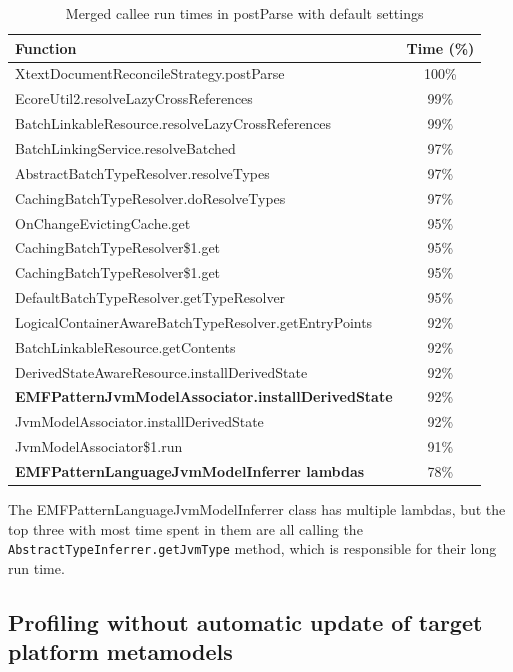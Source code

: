 \documentclass[11pt,a4paper,oneside]{report}
\begin{document}
\begin{table}[ht]
    \footnotesize
    \centering
    \begin{tabular}{ l c }
        \toprule
        Function & Time (\%) \\
        \midrule
        XtextDocumentReconcileStrategy.postParse & 100\% \\
        EcoreUtil2.resolveLazyCrossReferences & 99\% \\
        BatchLinkableResource.resolveLazyCrossReferences & 99\% \\
        BatchLinkingService.resolveBatched & 97\% \\
        AbstractBatchTypeResolver.resolveTypes & 97\% \\
        CachingBatchTypeResolver.doResolveTypes & 97\% \\
        OnChangeEvictingCache.get & 95\% \\
        CachingBatchTypeResolver\$1.get & 95\% \\
        CachingBatchTypeResolver\$1.get & 95\% \\
        DefaultBatchTypeResolver.getTypeResolver & 95\% \\
        LogicalContainerAwareBatchTypeResolver.getEntryPoints & 92\% \\
        BatchLinkableResource.getContents & 92\% \\
        DerivedStateAwareResource.installDerivedState & 92\% \\
        \textbf{EMFPatternJvmModelAssociator.installDerivedState} & 92\% \\
        JvmModelAssociator.installDerivedState & 92\% \\
        JvmModelAssociator\$1.run & 91\% \\
        \textbf{EMFPatternLanguageJvmModelInferrer lambdas} & 78\% \\
        \bottomrule
    \end{tabular}
    \caption{Merged callee run times in postParse with default settings}
    \label{tab:postparse-default}
\end{table}

The EMFPatternLanguageJvmModelInferrer class has multiple lambdas, but the top
three with most time spent in them are all calling the
\texttt{AbstractTypeInferrer.getJvmType} method, which is responsible for their
long run time.

\subsection{Profiling without automatic update of target platform metamodels}
\end{document}
